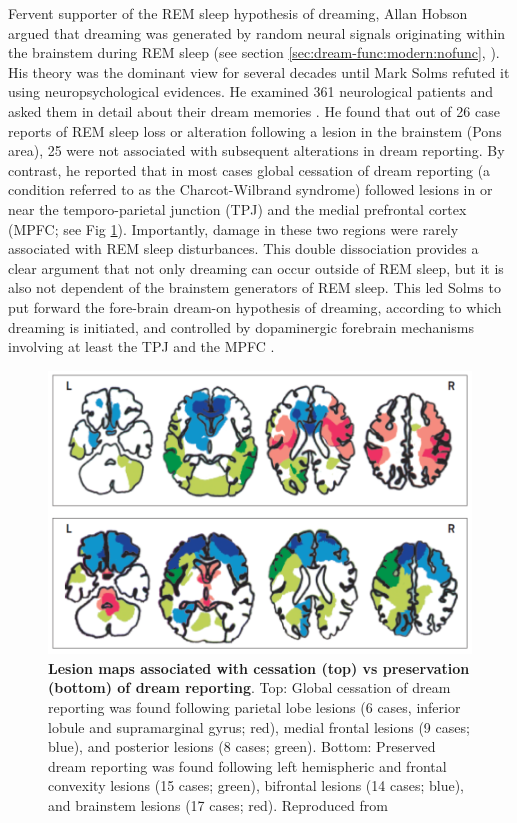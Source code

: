 Fervent supporter of the REM sleep hypothesis of dreaming, Allan Hobson argued that dreaming was generated by random neural signals originating within the brainstem during REM sleep (see section \ref{sec:dream-func:modern:nofunc}, \citealp{hobson_dream_1998}). His theory was the dominant view for several decades until Mark Solms refuted it using neuropsychological evidences. He examined 361 neurological patients and asked them in detail about their dream memories \citep{solms_neuropsychology_1997}. He found that out of 26 case reports of REM sleep loss or alteration following a lesion in the brainstem (Pons area), 25 were not associated with subsequent alterations in dream reporting. By contrast, he reported that in most cases global cessation of dream reporting (a condition referred to as the Charcot-Wilbrand syndrome) followed lesions in or near the temporo-parietal junction (TPJ) and the medial prefrontal cortex (MPFC; see Fig \ref{fig:intro:lesions}). Importantly, damage in these two regions were rarely associated with REM sleep disturbances. This double dissociation provides a clear argument that not only dreaming can occur outside of REM sleep, but it is also not dependent of the brainstem generators of REM sleep. This led Solms to put forward the fore-brain dream-on hypothesis of dreaming, according to which dreaming is initiated, and controlled by dopaminergic forebrain mechanisms involving at least the TPJ and the MPFC \citep{solms_dreaming_2000}.

\begin{figure}[htb]
	\includegraphics[width=\textwidth]{Fig/Intro/Intro_Lesions/Intro_Lesions.png}
	\caption[Lesion maps associated with cessation vs preservation of dream reporting]{\textbf{Lesion maps associated with cessation (top) vs preservation (bottom) of dream reporting}. Top: Global cessation of dream reporting was found following parietal lobe lesions (6 cases, inferior lobule and supramarginal gyrus; red), medial frontal lesions (9 cases; blue), and posterior lesions (8 cases; green). Bottom: Preserved dream reporting was found following left hemispheric and frontal convexity lesions (15 cases; green), bifrontal lesions (14 cases; blue), and brainstem lesions (17 cases; red). Reproduced from \citet{schwartz_dreaming:_2005}}
	\label{fig:intro:lesions}
\end{figure}

